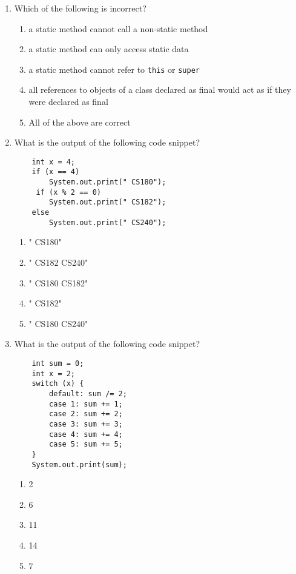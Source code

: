 \documentclass[S17-Final.tex]{subfiles}
\begin{document}
\begin{enumerate}
\item Which of the following is incorrect?

\begin{enumerate}
\item  a static method cannot call a non-static method
\item  a static method can only access static data
\item  a static method cannot refer to \texttt{this} or \texttt{super}
\item  all references to objects of a class declared as final would act as if they were declared as final \ifdraft \Ans \fi
\item  All of the above are correct
\end{enumerate}

\item What is the output of the following code snippet?
\begin{lstlisting}
    int x = 4;
    if (x == 4)
        System.out.print(" CS180");
	 if (x % 2 == 0) 
        System.out.print(" CS182");
    else
        System.out.print(" CS240");	
\end{lstlisting}
	
\begin{enumerate}
\item  " CS180"
\item  " CS182 CS240"
\item  " CS180 CS182" \ifdraft \Ans \fi 
\item  " CS182"
\item  " CS180 CS240"
\end{enumerate}

\item What is the output of the following code snippet?
\begin{lstlisting}
    int sum = 0;
    int x = 2;
    switch (x) {
        default: sum /= 2;
        case 1: sum += 1;
        case 2: sum += 2;
        case 3: sum += 3;
        case 4: sum += 4;
        case 5: sum += 5;
	}
	System.out.print(sum);
\end{lstlisting}
	
\begin{enumerate}
\item  2
\item  6
\item  11
\item  14 \ifdraft \Ans \fi 
\item  7
\end{enumerate}


\end{enumerate}
\end{document}

